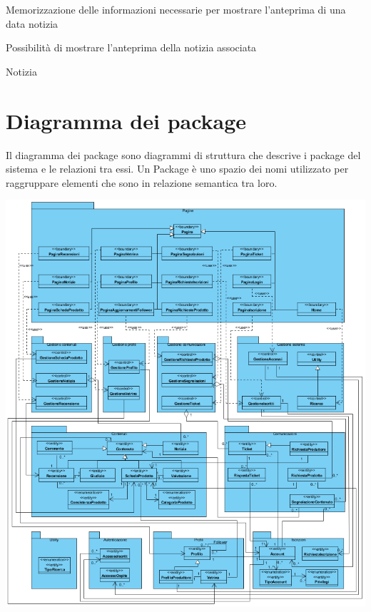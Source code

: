 
{\begin{itemWork}
	\item Memorizzazione delle informazioni necessarie per mostrare l'anteprima di una data notizia
	\item Possibilità di mostrare l'anteprima della notizia associata
\end{itemWork}}
{\begin{itemWork}
	\item Notizia
\end{itemWork}}


\section{Diagramma dei package}  \label{cha:package}
Il diagramma dei package sono diagrammi di struttura che descrive i package del sistema e le relazioni tra essi.
Un Package è uno spazio dei nomi utilizzato per raggruppare elementi che sono in relazione semantica tra loro.
\begin{center}
			\includegraphics[width=\linewidth]{assets/visualParadigm/package/DiagrammaPacakage}
\end{center}

